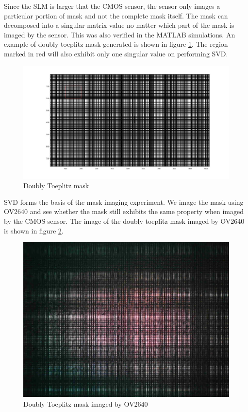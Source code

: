  Since the SLM is larger that the CMOS sensor, the sensor only images a particular portion of mask and not the complete mask itself.
The mask can decomposed into a singular matrix value no matter which part of the mask is imaged by the sensor. This was also verified in the MATLAB simulations. An example of doubly toeplitz mask generated is shown in figure \ref{fig:doubly_toepl_custom}. The region marked in red will also exhibit only one singular value on performing SVD.
\begin{figure}[h]
\centering
\includegraphics[scale=0.20]{pics/slm/mask_sub_prop.jpg}
\caption{Doubly Toeplitz mask}
\label{fig:doubly_toepl_custom}
\end{figure}
SVD forms the basis of the mask imaging experiment. We image the mask using OV2640 and see whether the mask still exhibits the same property when imaged by the CMOS sensor. The image of the doubly toeplitz mask imaged by OV2640 is shown in figure \ref{fig:dt_ov2640}.
\begin{figure}[h]
\centering
\includegraphics[scale=0.20]{pics/slm/ov2640dtmask.jpg}
\caption{Doubly Toeplitz mask imaged by OV2640}
\label{fig:dt_ov2640}
\end{figure}
